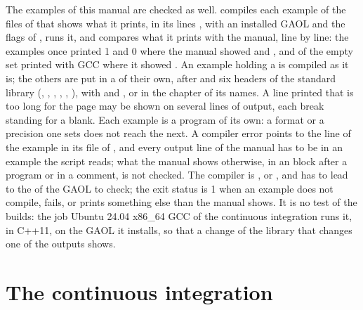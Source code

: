 \medskip
{}%
The examples of this manual are checked as well.
 compiles each example of
the files of  that shows what it
prints, in its lines , with an installed GAOL and the flags
of , runs it, and compares what it prints with the
manual, line by line:\newinvfive{} the examples once printed 1 and 0 where
the manual showed  and , and  of the
empty set printed  with GCC where it showed . An
example holding a  is compiled as it is; the others are put in
a  of their own, after  and six headers of the standard library (, ,
, , , ), with  and
, or  in the chapter of its
names. A line printed that is too long for the page may be shown on several
lines of output, each break standing for a blank. Each example is a program
of its own: a format or a precision one sets does not reach the next. A
compiler error points to the line of the example in its file of , and
every output line of the manual has to be in an example the script reads;
what the manual shows otherwise, in an  block after a
program or in a comment, is not checked. The compiler is , or
, and  has to lead to the  of
the GAOL to check; the exit status is 1 when an example does not compile,
fails, or prints something else than the manual shows. It is no test of the
builds: the job Ubuntu 24.04 x86\_64 GCC of the continuous integration runs
it, in C++11, on the GAOL it installs, so that a change of the library that
changes one of the outputs shows.

\section{The continuous integration}\label{sec:ci}

